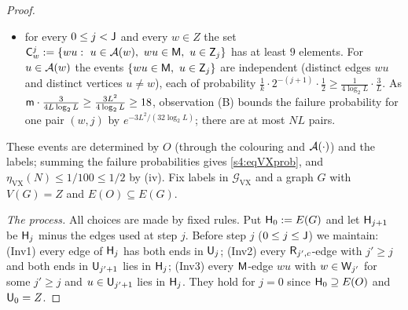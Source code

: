 \begin{proof}
\begin{itemize}
  mean with probability at most $e^{-10^{-4}\cdot6N/(3L)}\le e^{-N/(5000L)}$; there are $\vJ+1\le L$ values of $j$.
\item[(G4)] for every $0\le j<\mathsf{J}$ and every $w\in Z$ the set
  $\vC^j_w:=\{wu:\ u\in\Aw(w),\ wu\in\vM,\ u\in\vZ_j\}$ has at least $9$ elements. For $u\in\mathcal{A}(w)$ the events
  $\{wu\in\mathsf{M},\ u\in\mathsf{Z}_j\}$ are independent (distinct edges $wu$ and distinct vertices $u\ne w$), each of probability
  $\frac1k\cdot2^{-(j+1)}\cdot\frac12\ge\frac1{4\log_2L}\cdot\frac3L$. As
  $\mathsf{m}\cdot\frac{3}{4L\log_2L}\ge\frac{3L^2}{4\log_2L}\ge18$, observation \textup{(B)} bounds the failure
  probability for one pair $(w,j)$ by $e^{-3L^2/(32\log_2L)}$; there are at most $NL$ pairs.
\end{itemize}
These events are determined by $O$ (through the colouring and $\mathcal{A}(\cdot)$) and the labels; summing the failure
probabilities gives \eqref{s4:eqVXprob}, and $\eta_{\mathrm{VX}}(N)\le1/100\le1/2$ by (iv). Fix labels in
$\mathcal G_{\mathrm{VX}}$ and a graph $G$ with $V(G)=Z$ and $E(O)\subseteq E(G)$.

\emph{The process.} All choices are made by fixed rules. Put $\mathsf{H}_0:=E(G)$ and let $\mathsf{H}_{j+1}$ be $\mathsf{H}_j$ minus the
edges used at step $j$. Before step $j$ ($0\le j\le\mathsf{J}$) we maintain: (Inv1) every edge of $\mathsf{H}_j$ has both ends in
$\mathsf{U}_j$; (Inv2) every $\mathsf{R}_{j',c}$-edge with $j'\ge j$ and both ends in $\mathsf{U}_{j'+1}$ lies in $\mathsf{H}_j$; (Inv3) every
$\mathsf{M}$-edge $wu$ with $w\in\mathsf{W}_{j'}$ for some $j'\ge j$ and $u\in\mathsf{U}_{j'+1}$ lies in $\mathsf{H}_j$. They hold for $j=0$
since $\mathsf{H}_0\supseteq E(O)$ and $\mathsf{U}_0=Z$.


\end{proof}

